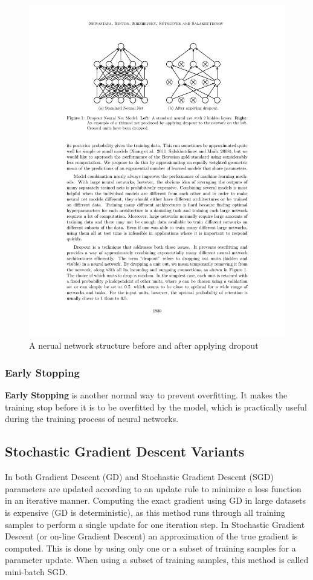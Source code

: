     \begin{figure}[!h]
        \centering
        \includegraphics[scale=0.7]{Figures/dropout.pdf}
        \caption{A nerual network structure before and after applying dropout}
        \label{dropout}
    \end{figure}

    \subsubsection{Early Stopping}
    \textbf{Early Stopping} is another normal way to prevent overfitting. 
    It makes the training stop before it is to be overfitted by the model, which is practically useful during the training process of neural networks.


    \subsection{Stochastic Gradient Descent Variants}
    \label{sgd}
    In both Gradient Descent (GD) and Stochastic Gradient Descent (SGD) parameters are updated according to an update rule to minimize a loss function in an iterative manner. Computing the exact gradient using GD in large datasets is expensive (GD is deterministic), as this method runs through all training samples to perform a single update for one iteration step. In Stochastic Gradient Descent (or on-line Gradient Descent) an approximation of the true gradient is computed. This is done by using only one or a subset of training samples for a parameter update. When using a subset of training samples, this method is called mini-batch SGD. 

